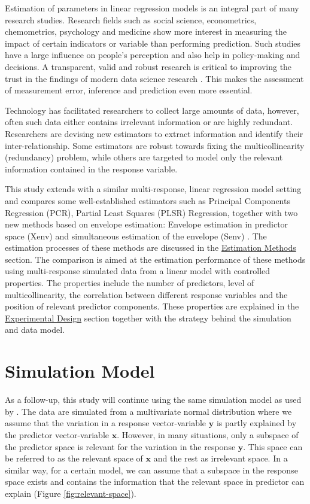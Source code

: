 \documentclass[12pt,3p,authoryear]{elsarticle}
\begin{document}
Estimation of parameters in linear regression models is an integral part
of many research studies. Research fields such as social science,
econometrics, chemometrics, psychology and medicine show more interest
in measuring the impact of certain indicators or variable than
performing prediction. Such studies have a large influence on people's
perception and also help in policy-making and decisions. A transparent,
valid and robust research is critical to improving the trust in the
findings of modern data science research \citep{eu2019auethics}. This
makes the assessment of measurement error, inference and prediction even
more essential.

Technology has facilitated researchers to collect large amounts of data,
however, often such data either contains irrelevant information or are
highly redundant. Researchers are devising new estimators to extract
information and identify their inter-relationship. Some estimators are
robust towards fixing the multicollinearity (redundancy) problem, while
others are targeted to model only the relevant information contained in
the response variable.

This study extends \citep{rimal2019pred} with a similar multi-response,
linear regression model setting and compares some well-established
estimators such as Principal Components Regression (PCR), Partial Least
Squares (PLSR) Regression, together with two new methods based on
envelope estimation: Envelope estimation in predictor space (Xenv)
\citep{cook2010envelope} and simultaneous estimation of the envelope
(Senv) \citep{cook2015simultaneous}. The estimation processes of these
methods are discussed in the
\protect\hyperlink{estimation-methods}{Estimation Methods} section. The
comparison is aimed at the estimation performance of these methods using
multi-response simulated data from a linear model with controlled
properties. The properties include the number of predictors, level of
multicollinearity, the correlation between different response variables
and the position of relevant predictor components. These properties are
explained in the \protect\hyperlink{experimental-design}{Experimental
Design} section together with the strategy behind the simulation and
data model.

\section{Simulation Model}\label{simulation-model}

As a follow-up, this study will continue using the same simulation model
as used by \citet{rimal2019pred}. The data are simulated from a
multivariate normal distribution where we assume that the variation in a
response vector-variable \(\mathbf{y}\) is partly explained by the
predictor vector-variable \(\mathbf{x}\). However, in many situations,
only a subspace of the predictor space is relevant for the variation in
the response \(\mathbf{y}\). This space can be referred to as the
relevant space of \(\mathbf{x}\) and the rest as irrelevant space. In a
similar way, for a certain model, we can assume that a subspace in the
response space exists and contains the information that the relevant
space in predictor can explain (Figure \ref{fig:relevant-space}).
\end{document}

